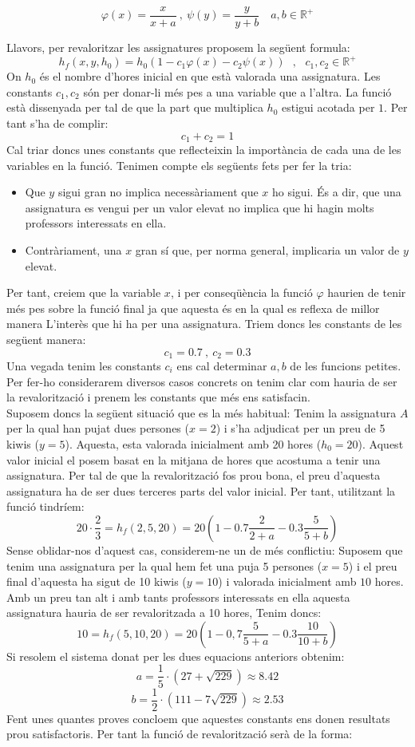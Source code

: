\documentclass[10pt,twocolumn]{article}
\newcommand{\esp}{\text{ }}
\begin{document}
$$\varphi (x)=\frac{x}{x+a}\ ,\  \psi(y)=\frac{y}{y+b} \quad a,b\in\mathbb{R}^{+} $$
	
Llavors, per revaloritzar les assignatures proposem la següent formula:
$$h_f(x,y,h_0)=h_0(1-c_1\varphi(x)-c_2\psi (x))\esp ,\esp c_1,c_2\in\mathbb{R}^+$$
On $h_0$ és el nombre d'hores inicial en que està valorada una assignatura. Les constants $c_1,c_2$ són per donar-li més pes a una variable que a l'altra. La funció està dissenyada per tal de que la part que multiplica $h_0$ estigui acotada per $1$. Per tant s'ha de complir:
$$
c_1+c_2=1
$$
Cal triar doncs unes constants que reflecteixin la importància de cada una de les variables en la funció. Tenimen compte els següents fets per fer la tria:
\begin{itemize}
\item Que $y$ sigui gran no implica necessàriament que $x$ ho sigui. És a dir, que una assignatura es vengui per un valor elevat no implica que hi hagin molts professors interessats en ella. 
\item Contràriament, una $x$ gran sí que, per norma general, implicaria un valor de $y$ elevat.
\end{itemize}
Per tant, creiem que la variable $x$, i per conseqüència la funció $\varphi$ haurien de tenir més pes sobre la funció final ja que aquesta és en la qual es reflexa de millor manera L'interès que hi ha per una assignatura. Triem doncs les constants de les següent manera:
$$c_1=0.7\ ,\ c_2=0.3$$
Una vegada tenim les constants $c_i$ ens cal determinar $a,b$ de les funcions petites. Per fer-ho considerarem diversos casos concrets on tenim clar com hauria de ser la revalorització i prenem les constants que més ens satisfacin.
	\\
	Suposem doncs la següent situació que es la més habitual: Tenim la assignatura $A$ per la qual han pujat dues persones ($x=2$) i s'ha adjudicat per un preu de 5 kiwis ($y=5$). Aquesta, esta valorada inicialment amb 20 hores ($h_0=20$). Aquest valor inicial el posem basat en la mitjana de hores que acostuma a tenir una assignatura. Per tal de que la revalorització fos prou bona, el preu d'aquesta assignatura ha de ser dues terceres parts del valor inicial. Per tant, utilitzant la funció tindríem:
	$$20\cdot\frac{2}{3}=h_f(2,5,20)=20(1-0.7\frac{2}{2+a}-0.3\frac{5}{5+b})$$
	Sense oblidar-nos d'aquest cas, considerem-ne un de més conflictiu: Suposem que tenim una assignatura per la qual hem fet una puja 5 persones ($x=5$) i el preu final d'aquesta ha sigut de 10 kiwis ($y=10$) i valorada inicialment amb $10$ hores. Amb un preu tan alt i amb tants professors interessats en ella aquesta assignatura hauria de ser revaloritzada a 10 hores, Tenim doncs:
	$$10=h_f(5,10,20)=20(1-0,7\frac{5}{5+a}-0.3\frac{10}{10+b})$$
	Si resolem el sistema donat per les dues equacions anteriors obtenim:
	$$a=\frac{1}{5}\cdot (27+\sqrt{229})\approx 8.42$$
	$$b=\frac{1}{2}\cdot(111-7\sqrt{229})\approx 2.53$$
	Fent unes quantes proves concloem que aquestes constants ens donen resultats prou satisfactoris. Per tant la funció de revalorització serà de la forma:
	
\end{document}
